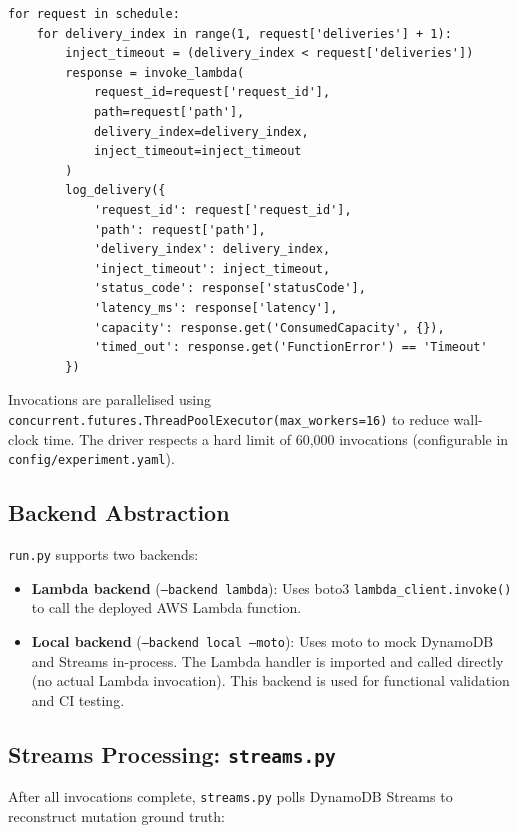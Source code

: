 \begin{verbatim}
for request in schedule:
    for delivery_index in range(1, request['deliveries'] + 1):
        inject_timeout = (delivery_index < request['deliveries'])
        response = invoke_lambda(
            request_id=request['request_id'],
            path=request['path'],
            delivery_index=delivery_index,
            inject_timeout=inject_timeout
        )
        log_delivery({
            'request_id': request['request_id'],
            'path': request['path'],
            'delivery_index': delivery_index,
            'inject_timeout': inject_timeout,
            'status_code': response['statusCode'],
            'latency_ms': response['latency'],
            'capacity': response.get('ConsumedCapacity', {}),
            'timed_out': response.get('FunctionError') == 'Timeout'
        })
\end{verbatim}

Invocations are parallelised using \texttt{concurrent.futures.ThreadPoolExecutor(max\_workers=16)} to reduce wall-clock time. The driver respects a hard limit of 60,000 invocations (configurable in \texttt{config/experiment.yaml}).

\subsection{Backend Abstraction}

\texttt{run.py} supports two backends:

\begin{itemize}
    \item \textbf{Lambda backend} (\texttt{--backend lambda}): Uses boto3 \texttt{lambda\_client.invoke()} to call the deployed AWS Lambda function.
    \item \textbf{Local backend} (\texttt{--backend local --moto}): Uses moto to mock DynamoDB and Streams in-process. The Lambda handler is imported and called directly (no actual Lambda invocation). This backend is used for functional validation and CI testing.
\end{itemize}

\subsection{Streams Processing: \texttt{streams.py}}

After all invocations complete, \texttt{streams.py} polls DynamoDB Streams to reconstruct mutation ground truth:

